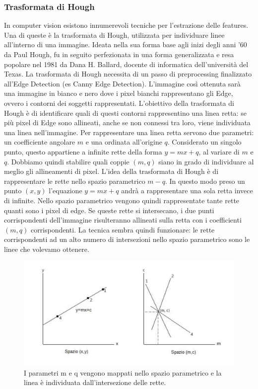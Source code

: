 \documentclass[twoside]{supsistudent}
\begin{document}
\subsubsection{Trasformata di Hough}
In computer vision esistono innumerevoli tecniche per l'estrazione delle features. Una 
di queste è la trasformata di Hough, utilizzata per individuare linee all'interno di una 
immagine. Ideata nella sua forma base agli inizi degli anni '60 da Paul Hough, fu in 
seguito perfezionata in una forma generalizzata e resa popolare nel 1981 da Dana H. 
Ballard, docente di informatica dell'università del Texas.
La trasformata di Hough necessita di un passo di preprocessing finalizzato all'Edge 
Detection (es Canny Edge Detection). L'immagine così ottenuta sarà una immagine in bianco e nero
dove i pixel bianchi rappresentano gli Edge, ovvero i contorni dei soggetti 
rappresentati. L'obiettivo della trasformata di Hough è di identificare quali di questi 
contorni rappresentino una linea retta: se più pixel di Edge sono allineati, anche se non 
connessi tra loro, viene individuata una linea nell'immagine.
Per rappresentare una linea retta servono due parametri: un coefficiente angolare $m$ e 
una ordinata all'origine $q$. Considerato un singolo punto, questo appartiene a infinite 
rette della forma $y=mx+q$, al variare di $m$ e $q$. Dobbiamo quindi stabilire quali coppie 
$(m,q)$ siano in grado di individuare al meglio gli allineamenti di pixel.
L'idea della trasformata di Hough è di rappresentare le rette nello spazio parametrico 
$m-q$. In questo modo preso un punto $(x,y)$ l'equazione $y=mx+q$ andrà a rappresentare 
una sola retta invece di infinite. Nello spazio parametrico vengono quindi rappresentate 
tante rette quanti sono i pixel di edge. Se queste rette si intersecano, i due punti 
corrispondenti dell'immagine risulteranno allineati sulla retta con i coefficienti 
$(m,q)$ corrispondenti. La tecnica sembra quindi funzionare: le rette corrispondenti ad 
un alto numero di intersezioni nello spazio parametrico sono le linee che volevamo 
ottenere.
\begin{figure}[H]
  \center
  \includegraphics[scale=0.38]{images/spazioMC.png}
  \caption{I parametri m e q vengono mappati nello spazio parametrico e la linea è 
  individuata dall'intersezione delle rette.}
\end{figure}
\end{document}
